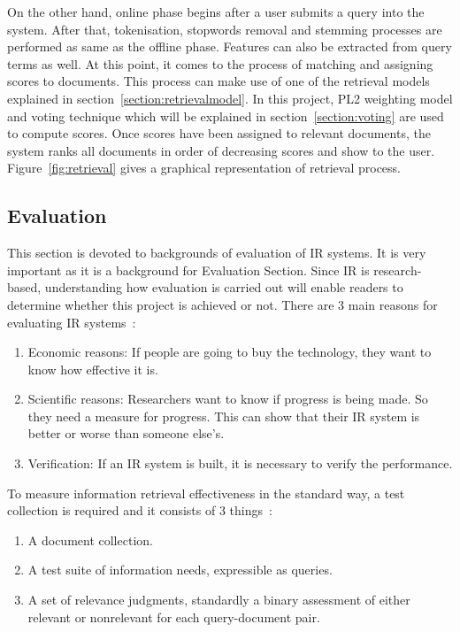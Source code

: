 
On the other hand, online phase begins after a user submits a query into the system. After that, tokenisation, stopwords removal and stemming processes 
are performed as same as the offline phase.
Features can also be extracted from query terms as well. At this point, it comes to the process of matching and assigning scores to documents.
This process can make use of one of the retrieval models explained in section~\ref{section:retrievalmodel}. In this project, PL2 weighting model and voting
technique which will be explained in section~\ref{section:voting} are used to compute scores.
Once scores have been assigned to relevant documents, the system ranks all documents in order of decreasing scores and 
show to the user. Figure~\ref{fig:retrieval} gives a graphical representation of retrieval process.

\subsection{Evaluation}\label{sec:evaluation}
This section is devoted to backgrounds of evaluation of IR systems. It is very important as it is a background for Evaluation Section. 
Since IR is research-based, understanding how evaluation is carried out will enable readers to determine whether 
this project is achieved or not. There are 3 main reasons for evaluating IR systems~\cite[P. 3]{eval}: 
\begin{enumerate}
 \item Economic reasons: If people are going to buy the technology, they want to know how effective it is.
 \item Scientific reasons: Researchers want to know if progress is being made. So they need a measure for progress. 
	This can show that their IR system is better or worse than someone else's.
 \item Verification: If an IR system is built, it is necessary to verify the performance.
\end{enumerate}

To measure information retrieval effectiveness in the standard way, a test collection is required and it consists of 3 things~\cite{evalweb}:
\begin{enumerate}
 \item A document collection.
 \item A test suite of information needs, expressible as queries.
 \item A set of relevance judgments, standardly a binary assessment of either relevant or nonrelevant for each query-document pair.
\end{enumerate}

